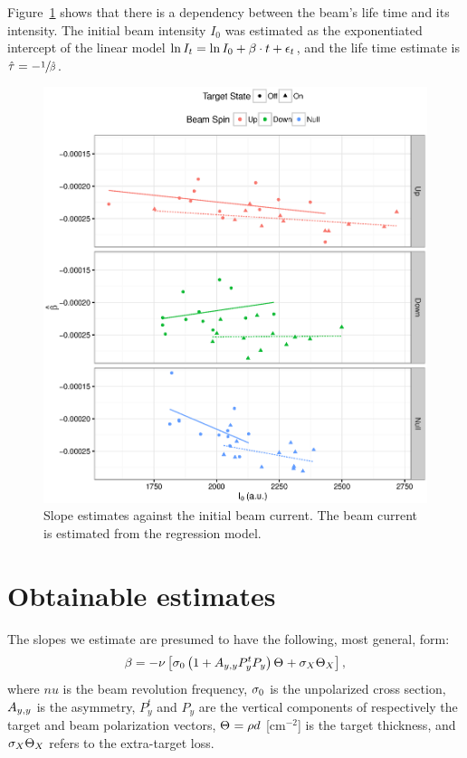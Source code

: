\documentclass{report}
\begin{document}
Figure~\ref{fig:Slp_VS_I0} shows that there is a dependency between the beam's life time and its intensity. The initial beam intensity $I_0$ was estimated as the exponentiated intercept of the linear model $\ln I_t = \ln I_0 + \slp\cdot t + \err_t$, and the life time estimate is $\hat{\tau} = -\sfrac{1}{\slp*}$. 

\begin{figure}[H]
	\centering
	\includegraphics{Slope_VS_IniCurrent_2016.eps}
	\caption{Slope estimates against the initial beam current. The beam current is estimated from the regression model.\label{fig:Slp_VS_I0}}
\end{figure}

\section{Obtainable estimates}

The slopes we estimate are presumed to have the following, most general, form:
\begin{equation}
	\slp = -\nu\bkt*{\CS[0]\bkt{1 + \Ayy P^t_y P_y}\Thick + \CS[X]\Thick[X]},
\end{equation}
where $nu$ is the beam revolution frequency, $\CS[0]$ is the unpolarized cross section, $\Ayy$ is the asymmetry, $P^t_y$ and $P_y$ are the vertical components of respectively the target and beam polarization vectors, $\Thick = \rho d$ [cm$^{-2}$] is the target thickness, and $\CS[X]\Thick[X]$ refers to the extra-target loss.
\end{document}
